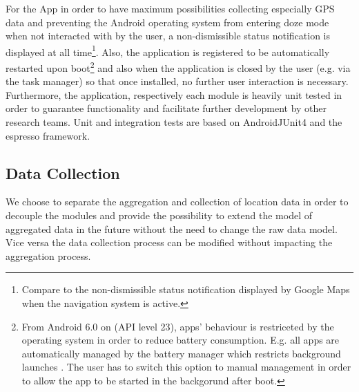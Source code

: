 For the App in order to have maximum possibilities collecting especially GPS data and preventing the Android operating system from entering doze mode when not interacted with by the user, a non-dismissible status notification is displayed at all time\footnote{Compare to the non-dismissible status notification displayed by Google Maps when the navigation system is active.}. Also, the application is registered to be automatically restarted upon boot\footnote{From Android 6.0 on (API level 23), apps' behaviour is restriceted by the operating system in order to reduce battery consumption. E.g. all apps are automatically managed by the battery manager which restricts background launches \parencite{background, doze}. The user has to switch this option to manual management in order to allow the app to be started in the backgorund after boot.} and also when the application is closed by the user (e.g. via the task manager) so that once installed, no further user interaction is necessary.
Furthermore, the application, respectively each module is heavily unit tested in order to guarantee functionality and facilitate further development by other research teams. Unit and integration tests are based on AndroidJUnit4 \parencite{androidJunit4} and the espresso \parencite{espresso} framework.


\subsection {Data Collection}
We choose to separate the aggregation and collection of location data in order to decouple the modules and provide the possibility to extend the model of aggregated data in the future without the need to change the raw data model. Vice versa the data collection process can be modified without impacting the aggregation process.\\

